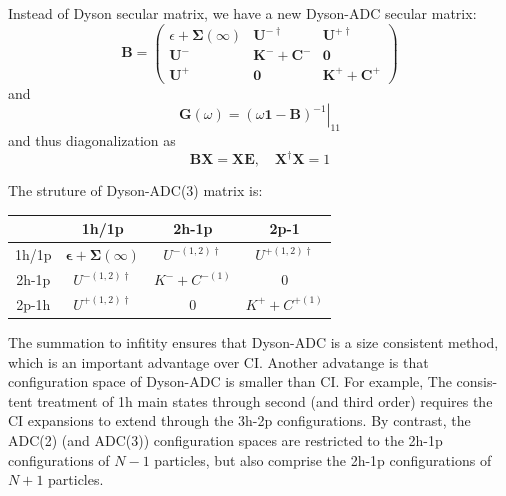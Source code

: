 Instead of Dyson secular matrix, we have a new Dyson-ADC secular matrix:
\begin{equation}
	\boldsymbol{B}=\left( \begin{array}{ccc}{\epsilon+\mathbf{\Sigma}(\infty)} & {\boldsymbol{U}^{-\dagger}} & {\boldsymbol{U}^{+\dagger}} \\ {\boldsymbol{U}^{-}} & {\boldsymbol{K}^{-}+\boldsymbol{C}^{-}} & {\mathbf{0}} \\ {\boldsymbol{U}^{+}} & {\boldsymbol{0}} & {\boldsymbol{K}^{+}+\boldsymbol{C}^{+}}\end{array}\right)
\end{equation}
and
\begin{equation}
	\boldsymbol{G}(\omega)=\left.(\omega \mathbf{1}-\boldsymbol{B})^{-1}\right|_{11}
\end{equation}
and thus diagonalization as
\begin{equation}
	\boldsymbol{B} \boldsymbol{X}=\boldsymbol{X} \boldsymbol{E}, \quad \boldsymbol{X}^{\dagger} \boldsymbol{X}=1
\end{equation}

The struture of Dyson-ADC(3) matrix is:
\begin{table}
	\centering
	\begin{tabular}{c|c|c|c|}
		   &   1h/1p  &   2h-1p &  2p-1
		\\
		\hline
		1h/1p  &  $\boldsymbol{\epsilon}+\boldsymbol{\Sigma}(\infty)$ & $U^{-(1,2)\dagger}$ & $ U^{+(1,2)\dagger} $
		\\
		\hline
		2h-1p &  $U^{-(1,2)\dagger}$ & $K^{-}+C^{-(1)}$ & 0
		\\
		\hline
		2p-1h &  $U^{+(1,2)\dagger}$ & 0 & $K^{+}+C^{+(1)}$
		\\
		\hline
	\end{tabular}
\end{table}

The summation to infitity ensures that Dyson-ADC is a size consistent method, which is an important advantage over CI.
Another advatange is that configuration space of Dyson-ADC is smaller than CI.
For example, The consis- tent treatment of 1h main states through second (and third order) requires the CI expansions to extend through the 3h-2p configurations.
By contrast, the ADC(2) (and ADC(3)) configuration spaces are restricted to the 2h-1p configurations of $N−1$ particles, but also comprise the 2h-1p configurations of $N+1$ particles.

